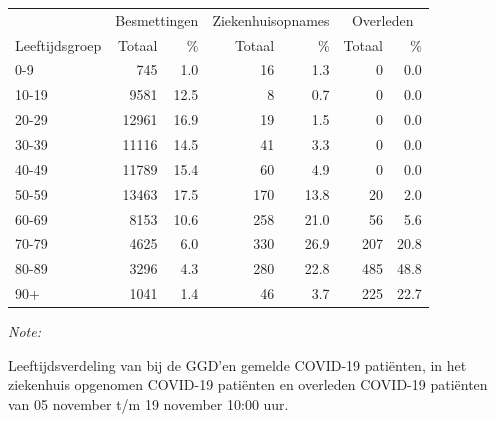 \documentclass[
  english,
  man,floatsintext]{apa6}
\begin{document}
\begin{table}[H]
\centering\begingroup\fontsize{11}{13}\selectfont

\begin{threeparttable}
\begin{tabular}{lrrrrrr}
\toprule
\multicolumn{1}{c}{ } & \multicolumn{2}{c}{Besmettingen} & \multicolumn{2}{c}{Ziekenhuisopnames} & \multicolumn{2}{c}{Overleden} \\
\cmidrule(l{3pt}r{3pt}){2-3} \cmidrule(l{3pt}r{3pt}){4-5} \cmidrule(l{3pt}r{3pt}){6-7}
Leeftijdsgroep & Totaal & \% & Totaal & \% & Totaal & \%\\
\midrule
0-9 & 745 & 1.0 & 16 & 1.3 & 0 & 0.0\\
10-19 & 9581 & 12.5 & 8 & 0.7 & 0 & 0.0\\
20-29 & 12961 & 16.9 & 19 & 1.5 & 0 & 0.0\\
30-39 & 11116 & 14.5 & 41 & 3.3 & 0 & 0.0\\
40-49 & 11789 & 15.4 & 60 & 4.9 & 0 & 0.0\\
50-59 & 13463 & 17.5 & 170 & 13.8 & 20 & 2.0\\
60-69 & 8153 & 10.6 & 258 & 21.0 & 56 & 5.6\\
70-79 & 4625 & 6.0 & 330 & 26.9 & 207 & 20.8\\
80-89 & 3296 & 4.3 & 280 & 22.8 & 485 & 48.8\\
90+ & 1041 & 1.4 & 46 & 3.7 & 225 & 22.7\\
\bottomrule
\end{tabular}
\begin{tablenotes}
\item \textit{Note: } 
\item Leeftijdsverdeling van bij de GGD’en gemelde COVID-19 patiënten, in het ziekenhuis opgenomen COVID-19 patiënten en overleden COVID-19 patiënten van 05 november t/m 19 november 10:00 uur.
\end{tablenotes}
\end{threeparttable}
\endgroup{}
\end{table}
\end{document}
